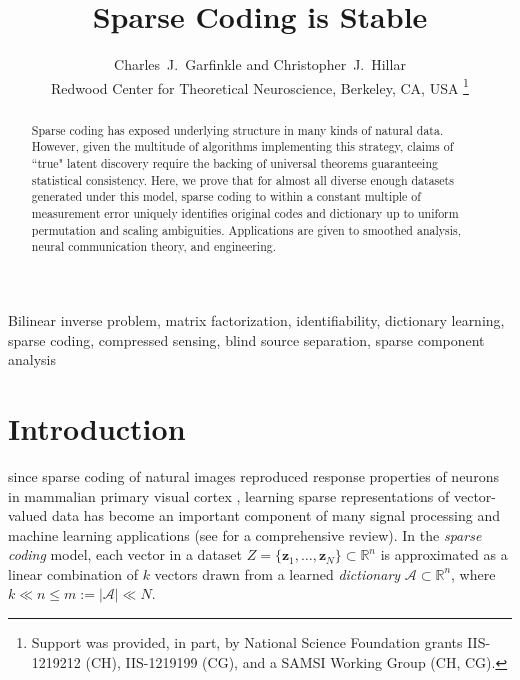 \documentclass[journal, twocolumn]{IEEEtran}
\begin{document}
\title{Sparse Coding is Stable}

\author{Charles~J.~Garfinkle and Christopher~J.~Hillar \\
Redwood Center for Theoretical Neuroscience, Berkeley, CA, USA
\thanks{%
Support was provided, in part, by National Science Foundation grants IIS-1219212 (CH), IIS-1219199 (CG), and a SAMSI Working Group (CH, CG).}}


\maketitle

\begin{abstract}
Sparse coding has exposed underlying structure in many kinds of natural data.  However, given the multitude of algorithms implementing this strategy, claims of ``true" latent discovery require the backing of universal theorems guaranteeing statistical consistency.  Here, we prove that for almost all diverse enough datasets generated under this model, sparse coding to within a constant multiple of measurement error uniquely identifies original codes and dictionary up to uniform permutation and scaling ambiguities.  Applications are given to smoothed analysis, neural communication theory, and engineering.
\end{abstract}

\begin{IEEEkeywords}
Bilinear inverse problem, matrix factorization, identifiability, dictionary learning, sparse coding, compressed sensing, blind source separation, sparse component analysis
\end{IEEEkeywords}


\section{Introduction}
 since sparse coding of natural images reproduced response properties of neurons in mammalian primary visual cortex \cite{Olshausen96}, learning sparse representations of vector-valued data has become an important component of many signal processing and machine learning applications (see \cite{Zhang15} for a comprehensive review). In the \textit{sparse coding} model, each vector in a dataset $Z = \{\mathbf{z}_1, \ldots, \mathbf{z}_N\} \subset \mathbb{R}^n$ is approximated as a linear combination of $k$ vectors drawn from a learned \emph{dictionary} $\mathcal{A} \subset \mathbb{R}^n$, where $k \ll n \leq m:= |\mathcal{A}| \ll N$. 
\end{document}
